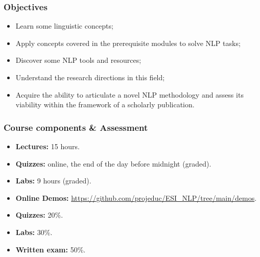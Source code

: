 \documentclass{beamer}
\begin{document}
\begin{frame}
\frametitle{Objectives}

\begin{itemize}
	\item Learn some linguistic concepts;
	\item Apply concepts covered in the prerequisite modules to solve NLP tasks;
	\item Discover some NLP tools and resources;
	\item Understand the research directions in this field;
	\item Acquire the ability to articulate a novel NLP methodology and assess its viability within the framework of a scholarly publication.
\end{itemize}

\end{frame}


\begin{frame}
\frametitle{Course components \& Assessment}

\begin{itemize}
	\item \textbf{Lectures:} 15 hours.
	\item \textbf{Quizzes:} online, the end of the day before midnight (graded).
	\item \textbf{Labs:} 9 hours (graded).
	\item \textbf{Online Demos:} {\scriptsize\url{https://github.com/projeduc/ESI_NLP/tree/main/demos}}.
\end{itemize}

\vfill

\begin{itemize}
	\item \textbf{Quizzes:} 20\%.
	\item \textbf{Labs:} 30\%.
	\item \textbf{Written exam:} 50\%.
\end{itemize}

\end{frame}
\end{document}
